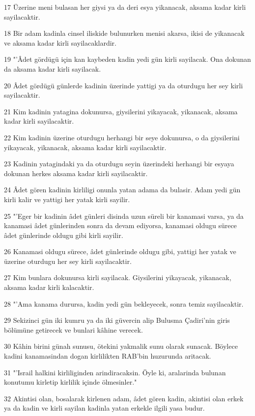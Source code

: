 \par 17 Üzerine meni bulasan her giysi ya da deri esya yikanacak, aksama kadar kirli sayilacaktir.
\par 18 Bir adam kadinla cinsel iliskide bulunurken menisi akarsa, ikisi de yikanacak ve aksama kadar kirli sayilacaklardir.
\par 19 "'Âdet gördügü için kan kaybeden kadin yedi gün kirli sayilacak. Ona dokunan da aksama kadar kirli sayilacak.
\par 20 Âdet gördügü günlerde kadinin üzerinde yattigi ya da oturdugu her sey kirli sayilacaktir.
\par 21 Kim kadinin yatagina dokunursa, giysilerini yikayacak, yikanacak, aksama kadar kirli sayilacaktir.
\par 22 Kim kadinin üzerine oturdugu herhangi bir seye dokunursa, o da giysilerini yikayacak, yikanacak, aksama kadar kirli sayilacaktir.
\par 23 Kadinin yatagindaki ya da oturdugu seyin üzerindeki herhangi bir esyaya dokunan herkes aksama kadar kirli sayilacaktir.
\par 24 Âdet gören kadinin kirliligi onunla yatan adama da bulasir. Adam yedi gün kirli kalir ve yattigi her yatak kirli sayilir.
\par 25 "'Eger bir kadinin âdet günleri disinda uzun süreli bir kanamasi varsa, ya da kanamasi âdet günlerinden sonra da devam ediyorsa, kanamasi oldugu sürece âdet günlerinde oldugu gibi kirli sayilir.
\par 26 Kanamasi oldugu sürece, âdet günlerinde oldugu gibi, yattigi her yatak ve üzerine oturdugu her sey kirli sayilacaktir.
\par 27 Kim bunlara dokunursa kirli sayilacak. Giysilerini yikayacak, yikanacak, aksama kadar kirli kalacaktir.
\par 28 "'Ama kanama durursa, kadin yedi gün bekleyecek, sonra temiz sayilacaktir.
\par 29 Sekizinci gün iki kumru ya da iki güvercin alip Bulusma Çadiri'nin giris bölümüne getirecek ve bunlari kâhine verecek.
\par 30 Kâhin birini günah sunusu, ötekini yakmalik sunu olarak sunacak. Böylece kadini kanamasindan dogan kirlilikten RAB'bin huzurunda aritacak.
\par 31 "'Israil halkini kirliliginden arindiracaksin. Öyle ki, aralarinda bulunan konutumu kirletip kirlilik içinde ölmesinler."
\par 32 Akintisi olan, bosalarak kirlenen adam, âdet gören kadin, akintisi olan erkek ya da kadin ve kirli sayilan kadinla yatan erkekle ilgili yasa budur.

